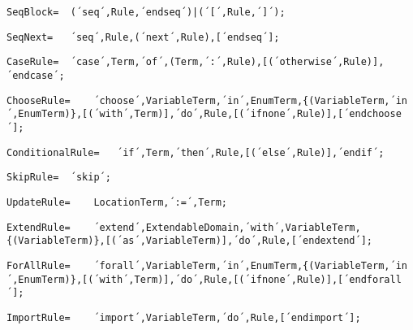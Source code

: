 \documentclass{article}
\begin{document}
    \begin{lstlisting}[mathescape=true]
     SeqBlock= 	(´seq´,Rule,´endseq´)|(´[´,Rule,´]´);
    \end{lstlisting}
    
    \begin{lstlisting}[mathescape=true]
     SeqNext= 	´seq´,Rule,(´next´,Rule),[´endseq´];
    \end{lstlisting}
    
    \begin{lstlisting}[mathescape=true]
     CaseRule= 	´case´,Term,´of´,(Term,´:´,Rule),[(´otherwise´,Rule)],´endcase´;
    \end{lstlisting}
    
    \begin{lstlisting}[mathescape=true]
     ChooseRule= 	´choose´,VariableTerm,´in´,EnumTerm,{(VariableTerm,´in´,EnumTerm)},[(´with´,Term)],´do´,Rule,[(´ifnone´,Rule)],[´endchoose´];
    \end{lstlisting}
    
    \begin{lstlisting}[mathescape=true]
     ConditionalRule= 	´if´,Term,´then´,Rule,[(´else´,Rule)],´endif´;
    \end{lstlisting}
    
    \begin{lstlisting}[mathescape=true]
     SkipRule= 	´skip´;
    \end{lstlisting}
    
    \begin{lstlisting}[mathescape=true]
     UpdateRule= 	LocationTerm,´:=´,Term;
    \end{lstlisting}
    
    \begin{lstlisting}[mathescape=true]
     ExtendRule= 	´extend´,ExtendableDomain,´with´,VariableTerm,{(VariableTerm)},[(´as´,VariableTerm)],´do´,Rule,[´endextend´];
    \end{lstlisting}
    
    \begin{lstlisting}[mathescape=true]
     ForAllRule= 	´forall´,VariableTerm,´in´,EnumTerm,{(VariableTerm,´in´,EnumTerm)},[(´with´,Term)],´do´,Rule,[(´ifnone´,Rule)],[´endforall´];
    \end{lstlisting}
    
    \begin{lstlisting}[mathescape=true]
     ImportRule= 	´import´,VariableTerm,´do´,Rule,[´endimport´];
    \end{lstlisting}
    
\end{document}
